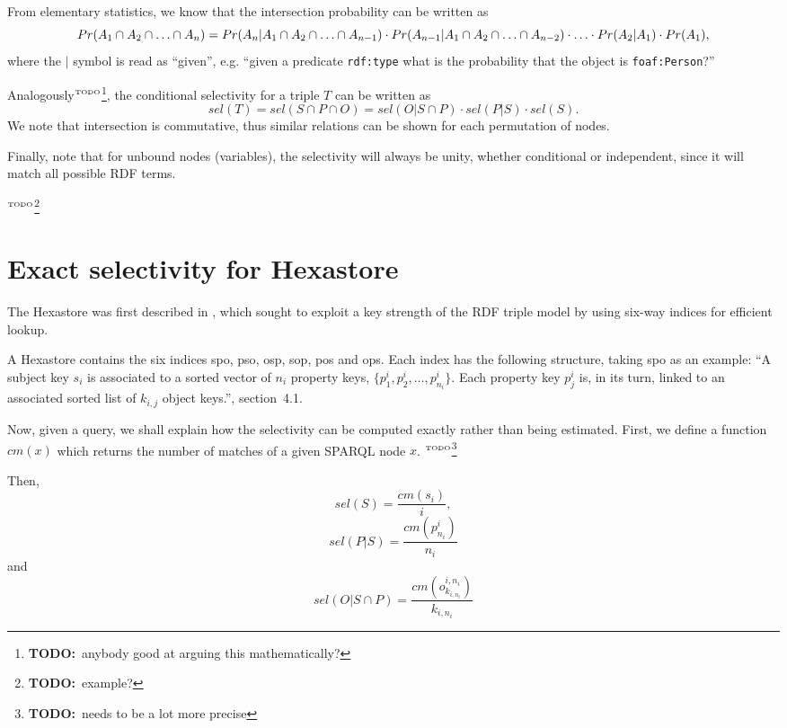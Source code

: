 \documentclass[12pt, draft]{article}
\newcommand{\rdfnode}[1]{\texttt{#1}}
\newcommand{\todo}[1]{\ensuremath{^{\textrm{\tiny{TODO}\normalsize}}}\footnote{\textbf{TODO:}~#1}}
\begin{document}
From elementary statistics, we know that the intersection probability
can be written as
\begin{equation}
Pr(A_1 \cap A_2  \cap \ldots \cap A_n) = 
  Pr(A_n | A_1 \cap A_2  \cap \ldots \cap A_{n-1}) \\
  \cdot Pr(A_{n-1} | A_1 \cap A_2  \cap \ldots \cap A_{n-2}) 
  \cdot \ldots \cdot Pr(A_2 | A_1) \cdot Pr(A_1) ,
\end{equation}
where the $|$ symbol is read as ``given'', e.g. ``given a predicate
\rdfnode{rdf:type} what is the probability that the object is \rdfnode{foaf:Person}?''

Analogously\todo{anybody good at arguing this mathematically?}, the conditional selectivity for a triple $T$ can be written as 
\begin{equation}
sel(T) = sel(S \cap P \cap O) = sel(O | S \cap P) \cdot sel(P | S)
\cdot sel(S) . 
\end{equation}
We note that intersection is commutative, thus similar
relations can be shown for each permutation of nodes.

Finally, note that for unbound nodes (variables), the selectivity will
always be unity, whether conditional or independent, since it will
match all possible RDF terms. 

\todo{example?}

\section{Exact selectivity for Hexastore}

The Hexastore was first described in
\cite{Weiss:2008:HSI:1453856.1453965}, which sought to exploit a key
strength of the RDF triple model by using six-way indices for
efficient lookup.

A Hexastore contains the six indices \textsf{spo}, \textsf{pso},
\textsf{osp}, \textsf{sop}, \textsf{pos} and \textsf{ops}. Each index
has the following structure, taking \textsf{spo} as an example: ``A
subject key $s_i$ is associated to a sorted vector of $n_i$ property
keys, $\{p_1^i , p_2^i , \ldots , p^i_{n_i} \}$. Each property key $p_j^i$
is, in its turn, linked to an associated sorted list of $k_{i,j}$
object keys.''\cite{Weiss:2008:HSI:1453856.1453965}, section~4.1.

Now, given a query, we shall explain how the selectivity can be
computed exactly rather than being estimated. First, we define a
function $cm(x)$ which returns the number of matches of a given SPARQL
node $x$. \todo{needs to be a lot more precise}

Then, 
\begin{equation}
sel(S) = \frac{cm(s_i)}{i} ,
\end{equation}
\begin{equation}
sel(P|S) = \frac{cm(p_{n_i}^i)}{n_i}
\end{equation}
and
\begin{equation}
sel(O|S \cap P) = \frac{cm(o_{k_{i,n_i}}^{i,n_i})}{k_{i,n_i}}
\end{equation}





\end{document}
